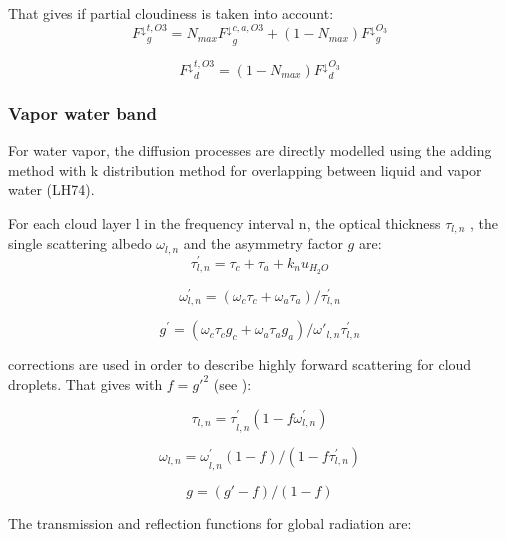 That gives if partial cloudiness is taken into account:
\begin{equation}
{F^\downarrow }_{g}^{t,O3}={N_{max}F^\downarrow
}_{g}^{c,a,O3}+(1-N_{max}){F^\downarrow }_{g}^{O_{3}}
\end{equation}

\begin{equation}
{F^\downarrow }_{d}^{t,O3}=(1-N_{max}){F^\downarrow }_{d}^{O_{3}}
\end{equation}
\subsubsection{Vapor water band}

For water vapor, the diffusion processes are directly modelled using the
adding method with k distribution method for overlapping between liquid and
vapor water (LH74).

For each cloud layer l in the frequency interval n, the optical thickness $\tau
_{l,n}$ , the single scattering albedo $\omega_{l,n}$ and the asymmetry
factor $g$ are:
\begin{equation}
\tau_{l,n}^{'}=\tau_{c}+\tau_{a}+k_{n}u_{H_{2}O}
\end{equation}

\begin{equation}
\omega_{l,n}^{'}=(\omega_{c}\tau_{c}+\omega_{a}\tau_{a})/\tau
_{l,n}^{'}
\end{equation}

\begin{equation}
g^{'}=(\omega_{c}\tau_{c}g_{c}+\omega_{a}\tau_{a}g_{a})/{\omega
'}_{l,n}\tau_{l,n}^{'}
\end{equation}

\cite{Joseph:1976} corrections are used in order to describe highly forward
scattering for cloud droplets. That gives with $f=g'^{2}$ (see \cite{Stephens:1984}):

\begin{equation}
{\tau_{l,n}=\tau }_{l,n}^{'}(1-f\omega_{l,n}^{'})
\end{equation}

\begin{equation}
{\omega_{l,n}=\omega }_{l,n}^{'}(1-f)/(1-f\tau_{l,n}^{'})
\end{equation}

\begin{equation}
g=(g'-f)/(1-f)
\end{equation}

The transmission and reflection functions for global radiation are:


